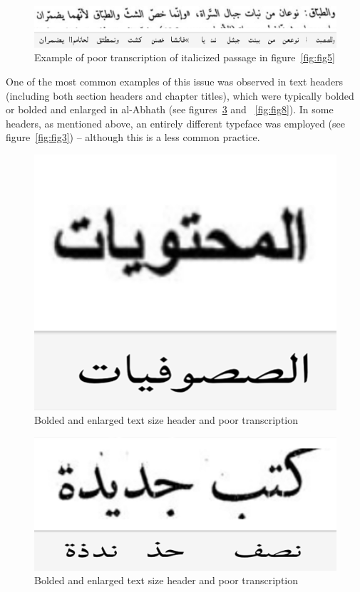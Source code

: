 \begin{figure}[h]
	\includegraphics[width=\linewidth]{images/image6.png}
	\caption{Example of poor transcription of italicized passage in figure~\ref{fig:fig5}}
	\label{fig:fig6}
\end{figure}

One of the most common examples of this issue was observed in text headers
(including both section headers and chapter titles), which were typically
bolded or bolded and enlarged in al-Abhath (see figures~\ref{fig:fig7} and
~\ref{fig:fig8}). In some headers, as mentioned above, an entirely different
typeface was employed (see figure~\ref{fig:fig3}) -- although this is a less
common practice.

\begin{figure}[h]
	\includegraphics[width=\linewidth]{images/image5.png}
	\caption{Bolded and enlarged text size header and poor transcription}
	\label{fig:fig7}
\end{figure}

  
\begin{figure}[h]
	\includegraphics[width=\linewidth]{images/image7.png}
	\caption{Bolded and enlarged text size header and poor transcription}
  	\label{fig:fig7}
\end{figure}

